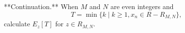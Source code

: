 **Continuation.** When \(M\) and \(N\) are even integers and
\[
T = \min\{k \mid k \geq 1, x_n \in R - R_{M,N}\},
\]
calculate \(E_z[T]\) for \(z \in R_{M,N}\).
